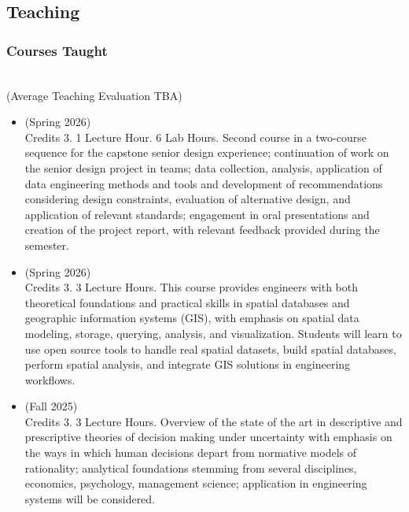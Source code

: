 \documentclass[11pt,oneside]{article}
\begin{document}
\subsection{Teaching}

\subsubsection{Courses Taught}
\hspace{40pt}{\frutigerregular Industrial and Systems Engineering, Texas A\&M University}\\
\hspace{40pt}({Average Teaching Evaluation TBA})
\vspace{1pt}
\begin{itemize}[leftmargin=40pt, label={-}]
\item {} (Spring 2026)\\
      Credits 3. 1 Lecture Hour. 6 Lab Hours. Second course in a two-course sequence for the capstone senior design experience; continuation of work on the senior design project in teams; data collection, analysis, application of data engineering methods and tools and development of recommendations considering design constraints, evaluation of alternative design, and application of relevant standards; engagement in oral presentations and creation of the project report, with relevant feedback provided during the semester.
\item {} (Spring 2026)\\
      Credits 3. 3 Lecture Hours. This course provides engineers with both theoretical foundations and practical skills in spatial databases and geographic information systems (GIS), with emphasis on spatial data modeling, storage, querying, analysis, and visualization. Students will learn to use open source tools to handle real spatial datasets, build spatial databases, perform spatial analysis, and integrate GIS solutions in engineering workflows.
\item {} (Fall 2025)\\
      Credits 3. 3 Lecture Hours. Overview of the state of the art in descriptive and prescriptive theories of decision making under uncertainty with emphasis on the ways in which human decisions depart from normative models of rationality; analytical foundations stemming from several disciplines, economics, psychology, management science; application in engineering systems will be considered.

\end{itemize}
\end{document}
